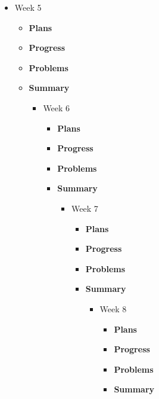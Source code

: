 \begin{itemize}
\begin{itemize}
\begin{itemize}
\begin{itemize}
\begin{itemize}
\begin{itemize}
\begin{itemize}
\begin{itemize}
\begin{itemize}
		\item{Week 5}
			\begin{itemize}
				\item \textbf{Plans} \\
				\item \textbf{Progress} \\
				\item \textbf{Problems} \\
				\item \textbf{Summary} \\
			\begin{itemize}

		\item{Week 6}
			\begin{itemize}
				\item \textbf{Plans} \\
				\item \textbf{Progress} \\
				\item \textbf{Problems} \\
				\item \textbf{Summary} \\
			\begin{itemize}

		\item{Week 7}
			\begin{itemize}
				\item \textbf{Plans} \\
				\item \textbf{Progress} \\
				\item \textbf{Problems} \\
				\item \textbf{Summary} \\
			\begin{itemize}

		\item{Week 8}
			\begin{itemize}
				\item \textbf{Plans} \\
				\item \textbf{Progress} \\
				\item \textbf{Problems} \\
				\item \textbf{Summary} \\
			\begin{itemize}


\end{itemize}
\end{itemize}
\end{itemize}
\end{itemize}
\end{itemize}
\end{itemize}
\end{itemize}
\end{itemize}
\end{itemize}
\end{itemize}
\end{itemize}
\end{itemize}
\end{itemize}
\end{itemize}
\end{itemize}
\end{itemize}
\end{itemize}
